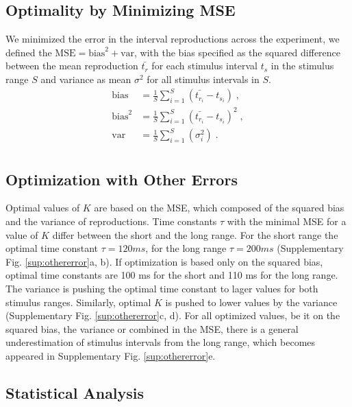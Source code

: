 \documentclass[10pt]{article}
\begin{document}
\subsection*{Optimality by Minimizing MSE}
We minimized the error in the interval reproductions across the experiment, we defined the $\text{MSE} = \text{bias}^2+\text{var}$, with the bias specified as the squared difference between the mean reproduction $\bar{t_{r}}$ for each stimulus interval $t_s$ in the stimulus range $S$ and variance as mean $\sigma^2$ for all stimulus intervals in $S$.
\begin{equation} \label{MSE}
	\begin{split}
	 \text{bias} & = \frac{1}{S} \sum \limits_{i=1}^{S} (\bar{t_{r_i}} - t_{s_i}) \;,\\
	 \text{bias}^2 & = \frac{1}{S} \sum \limits_{i=1}^{S}(\bar{t_{r_i}} - t_{s_i})^2 \;,\\
	 \text{var} & = \frac{1}{S} \sum \limits_{i=1}^{S}(\sigma_i^2) \;.\\
	\end{split}
\end{equation}

\subsection*{Optimization with Other Errors}
Optimal values of $K$ are based on the MSE, which composed of the squared bias and the variance of reproductions. 
Time constants $\tau$ with the minimal MSE for a value of $K$ differ between the short and the long range. For the short range the optimal time constant $\tau = 120 ms$, for the long range $\tau = 200 ms$ (Supplementary Fig. \ref{sup:othererror}a, b). If optimization is based only on the squared bias, optimal time constants are 100 ms for the short and 110 ms for the long range. 
The variance is pushing the optimal time constant to lager values for both stimulus ranges. 
Similarly, optimal $K$ is pushed to lower values by the variance (Supplementary Fig. \ref{sup:othererror}c, d).
For all optimized values, be it on the squared bias, the variance or combined in the MSE, there is a general underestimation of stimulus intervals from the long range, which becomes appeared in Supplementary Fig. \ref{sup:othererror}e.

\subsection*{Statistical Analysis}
\end{document}
